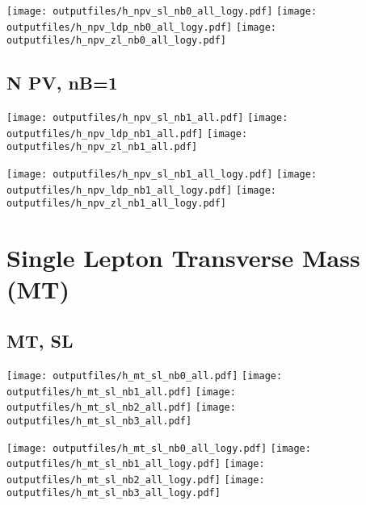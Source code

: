 \documentclass[11pt]{article}
\begin{document}
    \noindent
     \texttt{[image: outputfiles/h\_npv\_sl\_nb0\_all\_logy.pdf]}
     \texttt{[image: outputfiles/h\_npv\_ldp\_nb0\_all\_logy.pdf]}
     \texttt{[image: outputfiles/h\_npv\_zl\_nb0\_all\_logy.pdf]}




    \subsection{ N PV, nB=1 }

    \noindent
     \texttt{[image: outputfiles/h\_npv\_sl\_nb1\_all.pdf]}
     \texttt{[image: outputfiles/h\_npv\_ldp\_nb1\_all.pdf]}
     \texttt{[image: outputfiles/h\_npv\_zl\_nb1\_all.pdf]}

    \noindent
     \texttt{[image: outputfiles/h\_npv\_sl\_nb1\_all\_logy.pdf]}
     \texttt{[image: outputfiles/h\_npv\_ldp\_nb1\_all\_logy.pdf]}
     \texttt{[image: outputfiles/h\_npv\_zl\_nb1\_all\_logy.pdf]}



    \section{Single Lepton Transverse Mass (MT)}


    \subsection{ MT, SL }

    \noindent
     \texttt{[image: outputfiles/h\_mt\_sl\_nb0\_all.pdf]}
     \texttt{[image: outputfiles/h\_mt\_sl\_nb1\_all.pdf]}
     \texttt{[image: outputfiles/h\_mt\_sl\_nb2\_all.pdf]}
     \texttt{[image: outputfiles/h\_mt\_sl\_nb3\_all.pdf]}

    \noindent
     \texttt{[image: outputfiles/h\_mt\_sl\_nb0\_all\_logy.pdf]}
     \texttt{[image: outputfiles/h\_mt\_sl\_nb1\_all\_logy.pdf]}
     \texttt{[image: outputfiles/h\_mt\_sl\_nb2\_all\_logy.pdf]}
     \texttt{[image: outputfiles/h\_mt\_sl\_nb3\_all\_logy.pdf]}
\end{document}
